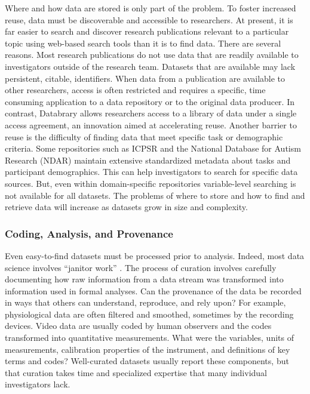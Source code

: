 \documentclass[letterpaper,man,apacite,natbib]{apa6}
\begin{document}
Where and how data are stored is only part of the problem.
To foster increased reuse, data must be discoverable and accessible to researchers.
At present, it is far easier to search and discover research publications relevant to a particular topic using web-based search tools than it is to find data.
There are several reasons.
Most research publications do not use data that are readily available to investigators outside of the research team.
Datasets that are available may lack persistent, citable, identifiers.
When data from a publication are available to other researchers, access is often restricted and requires a specific, time consuming application to a data repository or to the original data producer.
In contrast, Databrary allows researchers access to a library of data under a single access agreement, an innovation aimed at accelerating reuse.
Another barrier to reuse is the difficulty of finding data that meet specific task or demographic criteria.
Some repositories such as ICPSR and the National Database for Autism Research (NDAR) maintain extensive standardized metadata about tasks and participant demographics.
This can help investigators to search for specific data sources.
But, even within domain-specific repositories variable-level searching is not available for all datasets.
The problems of where to store and how to find and retrieve data will increase as datasets grow in size and complexity.

\subsubsection{Coding, Analysis, and Provenance}

Even easy-to-find datasets must be processed prior to analysis.
Indeed, most data science involves ``janitor work'' \cite{lohr_for_2014}.
The process of curation involves carefully documenting how raw information from a data stream was transformed into information used in formal analyses. 
Can the provenance of the data be recorded in ways that others can understand, reproduce, and rely upon?
For example, physiological data are often filtered and smoothed, sometimes by the recording devices.
Video data are usually coded by human observers and the codes transformed into quantitative measurements.
What were the variables, units of measurements, calibration properties of the instrument, and definitions of key terms and codes?
Well-curated datasets usually report these components, but that curation takes time and specialized expertise that many individual investigators lack.
\end{document}
